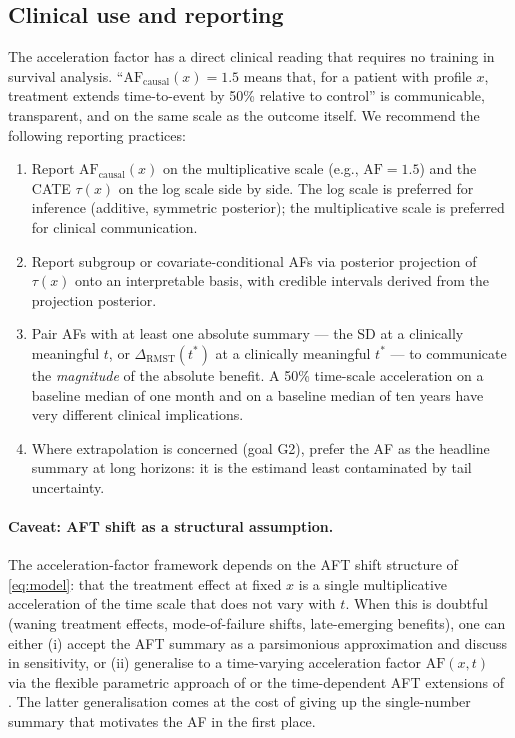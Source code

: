 \documentclass[11pt]{article}
\newcommand{\tauf}{\tau}
\newcommand{\RMST}{\mathrm{RMST}}
\newcommand{\AF}{\mathrm{AF}}
\begin{document}
\subsection{Clinical use and reporting}

The acceleration factor has a direct clinical reading that requires no
training in survival analysis. ``$\AF_{\mathrm{causal}}(x) = 1.5$ means
that, for a patient with profile $x$, treatment extends time-to-event by
50\% relative to control'' is communicable, transparent, and on the same
scale as the outcome itself. We recommend the following reporting
practices:

\begin{enumerate}[leftmargin=*]
  \item Report $\AF_{\mathrm{causal}}(x)$ on the multiplicative scale
        (e.g., $\AF = 1.5$) and the CATE $\tauf(x)$ on the log scale
        side by side. The log scale is preferred for inference (additive,
        symmetric posterior); the multiplicative scale is preferred for
        clinical communication.
  \item Report subgroup or covariate-conditional AFs via posterior
        projection of $\tauf(x)$ onto an interpretable basis, with
        credible intervals derived from the projection posterior.
  \item Pair AFs with at least one absolute summary --- the SD at a
        clinically meaningful $t$, or $\Delta_{\RMST}(t^{*})$ at a
        clinically meaningful $t^{*}$ --- to communicate the
        \emph{magnitude} of the absolute benefit. A 50\% time-scale
        acceleration on a baseline median of one month and on a baseline
        median of ten years have very different clinical implications.
  \item Where extrapolation is concerned (goal G2), prefer the AF as the
        headline summary at long horizons: it is the estimand least
        contaminated by tail uncertainty.
\end{enumerate}

\paragraph{Caveat: AFT shift as a structural assumption.}
The acceleration-factor framework depends on the AFT shift structure of
\eqref{eq:model}: that the treatment effect at fixed $x$ is a single
multiplicative acceleration of the time scale that does not vary with
$t$. When this is doubtful (waning treatment effects, mode-of-failure
shifts, late-emerging benefits), one can either (i) accept the AFT
summary as a parsimonious approximation and discuss in sensitivity, or
(ii) generalise to a time-varying acceleration factor
$\AF(x, t)$ via the flexible parametric approach of
\citet{Crowther2023} or the time-dependent AFT extensions of
\citet{Pang2021}. The latter generalisation comes at the cost of giving
up the single-number summary that motivates the AF in the first place.
\end{document}
